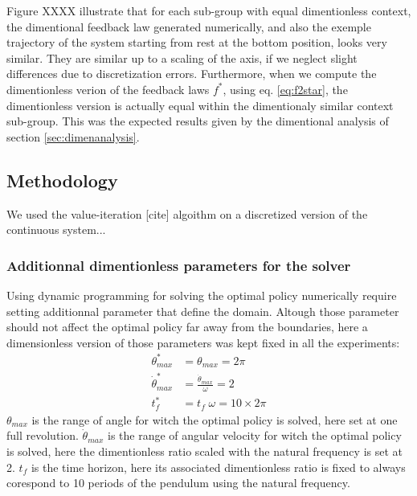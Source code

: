 Figure XXXX illustrate that for each sub-group with equal dimentionless context, the dimentional feedback law generated numerically, and also the exemple trajectory of the system starting from rest at the bottom position, looks very similar. They are similar up to a scaling of the axis, if we neglect slight differences due to discretization errors. Furthermore, when we compute the dimentionless verion of the feedback laws $f^*$, using eq. \eqref{eq:f2star}, the dimentionless version is actually equal within the dimentionaly similar context sub-group. This was the expected results given by the dimentional analysis of section \ref{sec:dimenanalysis}.


\subsection{Methodology}

We used the value-iteration [cite] algoithm on a discretized version of the continuous system...

\subsubsection{Additionnal dimentionless parameters for the solver}

Using dynamic programming for solving the optimal policy numerically require setting additionnal parameter that define the domain. Altough those parameter should not affect the optimal policy far away from the boundaries, here a dimensionless version of those parameters was kept fixed in all the experiments:
\begin{align}
\theta^*_{max} &= \theta_{max} = 2 \pi \\
\dot{\theta}^*_{max} &= \frac{ \dot{\theta}_{max} }{\omega} = 2 \\
t^*_{f} &= t_{f} \; \omega = 10 \times 2 \pi 
\end{align}
$\theta_{max}$ is the range of angle for witch the optimal policy is solved, here set at one full revolution. $\dot{\theta}_{max}$ is the range of angular velocity for witch the optimal policy is solved, here the dimentionless ratio scaled with the natural frequency is set at 2. $t_{f}$ is the time horizon, here its associated dimentionless ratio is fixed to always corespond to 10 periods of the pendulum using the natural frequency.




